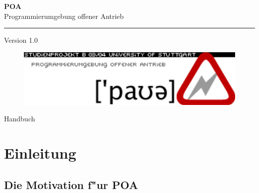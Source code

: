 \documentclass[a4paper,titlepage,12pt,ngerman]{scrbook}
\newcommand\version{Version 1.0 \xspace}
\begin{document}

\begin{titlepage}
\renewcommand{\thefootnote}{\fnsymbol{footnote}}
{\Huge
\raggedright
\textbf{POA} \\
\huge Programmierumgebung offener Antrieb
\rule{\textwidth}{0.75pt}
\par
}
\begin{flushleft}
\normalsize
\version
\vfill

\begin{figure}[htbp]
\begin{center}
\includegraphics[width=15cm]{poa-logo}
\end{center}
\end{figure}

\end{flushleft}
\vfill

{\parindent=0cm
\Huge Handbuch
}


\setcounter{footnote}{0}
\end{titlepage}



\tableofcontents

\chapter{Einleitung}
\section{Die Motivation f"ur POA}
\end{document}
